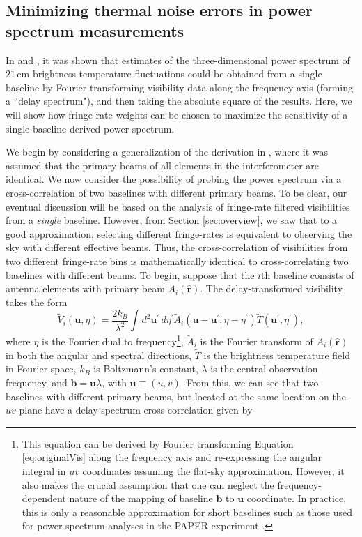 \documentclass[twocolumn,apj,numberedappendix]{emulateapj}
\newcommand{\rhat}{\hat{\mathbf{r}}}
\begin{document}
\subsection{Minimizing thermal noise errors in power spectrum measurements}
\label{sec:PspecOptimization}

In \citet{parsons_et_al2012a} and \citet{P14}, it was shown that estimates of the three-dimensional power spectrum of $21\,\textrm{cm}$ brightness temperature fluctuations could be obtained from a single baseline by Fourier transforming visibility data along the frequency axis (forming a ``delay spectrum"), and then taking the absolute square of the results. Here, we will show how fringe-rate weights can be chosen to maximize the sensitivity of a single-baseline-derived power spectrum.

We begin by considering a generalization of the derivation in \citet{P14}, where it was assumed that the primary beams of all elements in the interferometer are identical. We now consider the possibility of probing the power spectrum via a cross-correlation of two baselines with different primary beams. To be clear, our eventual discussion will be based on the analysis of fringe-rate filtered visibilities from a \emph{single} baseline. However, from Section \ref{sec:overview}, we saw that to a good approximation, selecting different fringe-rates is equivalent to observing the sky with different effective beams. Thus, the cross-correlation of visibilities from two different fringe-rate bins is mathematically identical to cross-correlating two baselines with different beams. To begin, suppose that the $i$th baseline consists of antenna elements with primary beam $A_i (\rhat)$. The delay-transformed visibility takes the form
\begin{equation}
\widetilde{V}_i(\mathbf{u},\eta) = \frac{2 k_B}{\lambda^2} \int  d^2 \mathbf{u}^\prime \, d\eta^\prime \widetilde{A}_i (\mathbf{u} -\mathbf{u}^\prime, \eta-\eta^\prime) \widetilde{T}(\mathbf{u}^\prime , \eta^\prime),
\end{equation}
where $\eta$ is the Fourier dual to frequency\footnote{This equation can be derived by Fourier transforming Equation 
\eqref{eq:originalVis} along the frequency axis and re-expressing the angular integral in $uv$ coordinates assuming the flat-sky approximation. However, it also makes the crucial assumption that one can neglect the frequency-dependent nature of the mapping of baseline $\mathbf{b}$ to $\mathbf{u}$ coordinate. In practice, this is only a reasonable approximation for short baselines \citep{parsons_et_al2012b,liu_et_al2014a} such as those used for power spectrum analyses in the PAPER experiment \citep{P14,J14,ali_et_al2015}.
}, $\widetilde{A}_i $ is the Fourier transform of $A_i (\rhat)$ in both the angular and spectral directions, $\widetilde{T}$ is the brightness temperature field in Fourier space, $k_B$ is Boltzmann's constant, $\lambda$ is the central observation frequency, and $\mathbf{b} = \mathbf{u} \lambda$, with $\mathbf{u} \equiv (u,v)$. From this, we can see that two baselines with different primary beams, but located at the same location on the $uv$ plane have a delay-spectrum cross-correlation given by
\end{document}

